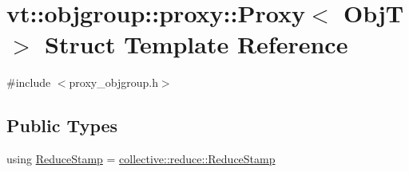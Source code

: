 \hypertarget{structvt_1_1objgroup_1_1proxy_1_1_proxy}{}\section{vt\+:\+:objgroup\+:\+:proxy\+:\+:Proxy$<$ ObjT $>$ Struct Template Reference}
\label{structvt_1_1objgroup_1_1proxy_1_1_proxy}


{\ttfamily \#include $<$proxy\+\_\+objgroup.\+h$>$}

\subsection*{Public Types}
\begin{DoxyCompactItemize}
\item 
using \hyperlink{structvt_1_1objgroup_1_1proxy_1_1_proxy_a337be4c20cf11ff6477c7a66208cc909}{Reduce\+Stamp} = \hyperlink{namespacevt_1_1collective_1_1reduce_a7b7cb3021ac5654d92825d9fab0250b2}{collective\+::reduce\+::\+Reduce\+Stamp}
\end{DoxyCompactItemize}
